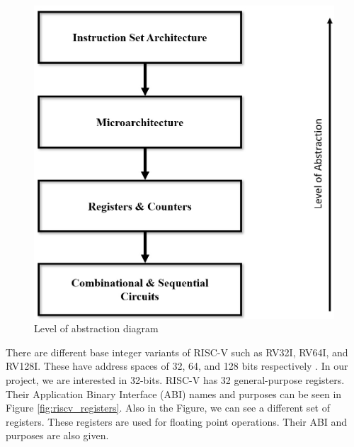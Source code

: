 \begin{figure}[h!]
    \centering
    \includegraphics[scale=0.25]{riscv/level_of_abstraction_diagram.jpeg}
    \caption{Level of abstraction diagram \cite{levelofabstrac}}
    \label{fig:level_of_abstraction_diagram}
\end{figure}

There are different base integer variants of RISC-V such as RV32I, RV64I, and RV128I. These have address spaces of 32, 64, and 128 bits respectively \cite{Altinayozlem}. In our project, we are interested in 32-bits. RISC-V has 32 general-purpose registers. Their Application Binary Interface (ABI) names and purposes can be seen in Figure \ref{fig:riscv_registers}. Also in the Figure, we can see a different set of registers. These registers are used for floating point operations. Their ABI and purposes are also given.

